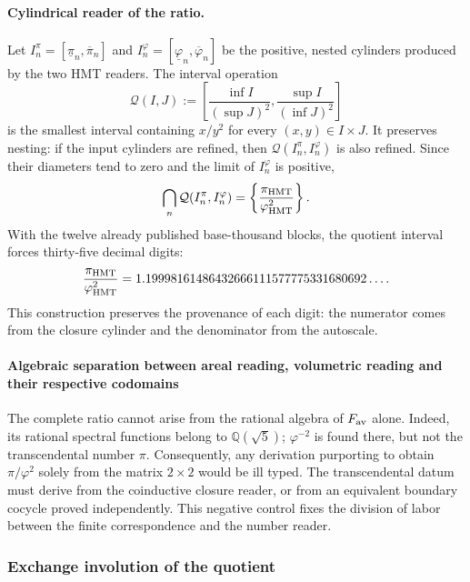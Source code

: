 \paragraph{Cylindrical reader of the ratio.}
Let \(I_n^\pi=[\underline\pi_n,\overline\pi_n]\) and
\(I_n^\varphi=[\underline\varphi_n,\overline\varphi_n]\) be the positive,
nested cylinders produced by the two HMT readers\@. The interval
operation
\[
 \mathcal Q(I,J)
 :=
 \left[
 \frac{\inf I}{(\sup J)^2},
 \frac{\sup I}{(\inf J)^2}
 \right]
\]
is the smallest interval containing \(x/y^2\) for every
\((x,y)\in I\times J\). It preserves nesting: if the input cylinders
are refined, then \(\mathcal Q(I_n^\pi,I_n^\varphi)\) is also refined. Since their
diameters tend to zero and the limit of \(I_n^\varphi\) is positive,
\[
 \bigcap_n\mathcal Q(I_n^\pi,I_n^\varphi)
 =
 \left\{\frac{\pi_{\rm HMT}}{\varphi_{\rm HMT}^2}\right\}.
\]
With the twelve already published base-thousand blocks, the quotient interval forces
thirty-five decimal digits:
\[
 \frac{\pi_{\rm HMT}}{\varphi_{\rm HMT}^2}
 =
 1.19998161486432666111577775331680692\ldots.
\]
This construction preserves the provenance of each digit: the numerator
comes from the closure cylinder and the denominator from the autoscale.

\paragraph{Algebraic separation between areal reading, volumetric reading and their respective codomains}
The complete ratio cannot arise from the rational algebra of
\(F_{\rm av}\) alone. Indeed, its rational spectral functions belong to
\(\mathbb Q(\sqrt5)\); \(\varphi^{-2}\) is found there, but not the
transcendental number \(\pi\). Consequently, any derivation purporting to
obtain \(\pi/\varphi^2\) solely from the matrix \(2\times2\) would be
ill typed. The transcendental datum must derive from the coinductive closure
reader, or from an equivalent boundary cocycle proved
independently. This negative control fixes the division of labor between
the finite correspondence and the number reader.

\subsubsection{Exchange involution of the quotient}
\label{p12-83-c16-s2:sec:espejo-pi-phi-electron-hmt}

